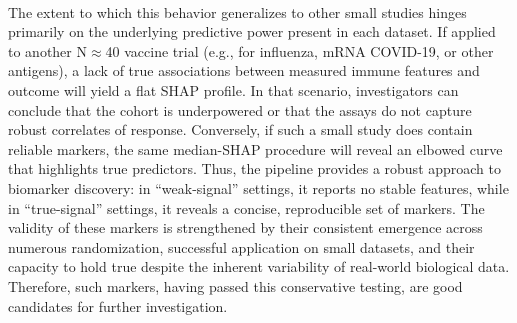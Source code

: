 \documentclass[12pt,a4paper]{report}
\begin{document}
\\
The extent to which this behavior generalizes to other small studies hinges primarily on the underlying predictive power present in each dataset. If applied to another N$\approx$40 vaccine trial (e.g., for influenza, mRNA COVID-19, or other antigens), a lack of true associations between measured immune features and outcome will yield a flat SHAP profile. In that scenario, investigators can conclude that the cohort is underpowered or that the assays do not capture robust correlates of response. Conversely, if such a small study does contain reliable markers, the same median-SHAP procedure will reveal an elbowed curve that highlights true predictors. Thus, the pipeline provides a robust approach to biomarker discovery: in “weak-signal” settings, it reports no stable features, while in “true-signal” settings, it reveals a concise, reproducible set of markers. The validity of these markers is strengthened by their consistent emergence across numerous randomization, successful application on small datasets, and their capacity to hold true despite the inherent variability of real-world biological data. Therefore, such markers, having passed this conservative testing, are good candidates for further investigation.

\end{document}
